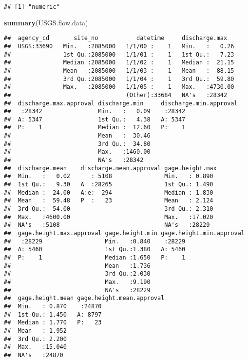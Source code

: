 \documentclass[]{article}
\newenvironment{Shaded}{\begin{snugshade}}{\end{snugshade}}
\newcommand{\KeywordTok}[1]{\textcolor[rgb]{0.13,0.29,0.53}{\textbf{#1}}}
\newcommand{\NormalTok}[1]{#1}
\begin{document}
\begin{verbatim}
## [1] "numeric"
\end{verbatim}

\begin{Shaded}
\begin{Highlighting}[]
\KeywordTok{summary}\NormalTok{(USGS.flow.data)}
\end{Highlighting}
\end{Shaded}

\begin{verbatim}
##  agency_cd       site_no           datetime     discharge.max    
##  USGS:33690   Min.   :2085000   1/1/00 :    1   Min.   :   0.26  
##               1st Qu.:2085000   1/1/01 :    1   1st Qu.:   7.23  
##               Median :2085000   1/1/02 :    1   Median :  21.15  
##               Mean   :2085000   1/1/03 :    1   Mean   :  88.15  
##               3rd Qu.:2085000   1/1/04 :    1   3rd Qu.:  59.80  
##               Max.   :2085000   1/1/05 :    1   Max.   :4730.00  
##                                 (Other):33684   NA's   :28342    
##  discharge.max.approval discharge.min     discharge.min.approval
##   :28342                Min.   :   0.09    :28342               
##  A: 5347                1st Qu.:   4.38   A: 5347               
##  P:    1                Median :  12.60   P:    1               
##                         Mean   :  30.46                         
##                         3rd Qu.:  34.80                         
##                         Max.   :1460.00                         
##                         NA's   :28342                           
##  discharge.mean    discharge.mean.approval gage.height.max 
##  Min.   :   0.02      : 5108               Min.   : 0.890  
##  1st Qu.:   9.30   A  :28265               1st Qu.: 1.490  
##  Median :  24.00   A:e:  294               Median : 1.830  
##  Mean   :  59.48   P  :   23               Mean   : 2.124  
##  3rd Qu.:  54.00                           3rd Qu.: 2.310  
##  Max.   :4600.00                           Max.   :17.020  
##  NA's   :5108                              NA's   :28229   
##  gage.height.max.approval gage.height.min gage.height.min.approval
##   :28229                  Min.   :0.840    :28229                 
##  A: 5460                  1st Qu.:1.380   A: 5460                 
##  P:    1                  Median :1.650   P:    1                 
##                           Mean   :1.736                           
##                           3rd Qu.:2.030                           
##                           Max.   :9.190                           
##                           NA's   :28229                           
##  gage.height.mean gage.height.mean.approval
##  Min.   : 0.870    :24870                  
##  1st Qu.: 1.450   A: 8797                  
##  Median : 1.770   P:   23                  
##  Mean   : 1.952                            
##  3rd Qu.: 2.200                            
##  Max.   :15.040                            
##  NA's   :24870
\end{verbatim}
\end{document}
